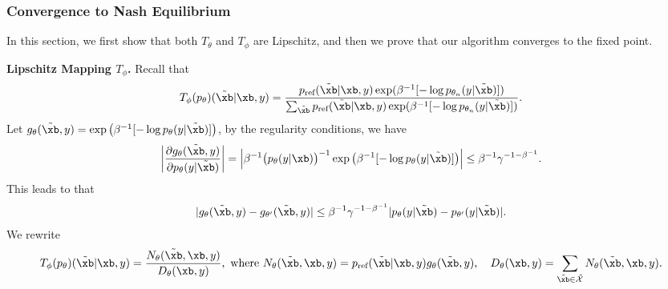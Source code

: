 \subsubsection{Convergence to Nash Equilibrium}
In this section, we first show that both $T_\theta$ and $T_\phi$ are Lipschitz, and then we prove that our algorithm converges to the fixed point. 

\textbf{Lipschitz Mapping $T_\phi$.} Recall that
\begin{align*}
    T_\phi(p_\theta)(\tilde{\xb}|\xb,y) = \frac{p_{\text{ref}}(\tilde{\xb}|\xb,y) \exp(\beta^{-1} [-\log p_{\theta_{n}}(y|\tilde{\xb})] )}{\sum_{\tilde{\xb}} p_{\text{ref}}(\tilde{\xb} |\xb,y) \exp(\beta^{-1} [-\log p_{\theta_{n}}(y|\tilde{\xb})] )}.
\end{align*}
Let $g_\theta(\tilde\xb,y) = \exp\big(\beta^{-1} [-\log p_{\theta}(y|\tilde{\xb})] \big)$, by the regularity conditions, we have
\begin{align*}
    \bigg|\frac{\partial g_\theta (\tilde\xb,y)}{\partial p_\theta(y | \tilde{\xb})}\bigg|  = \Big|\beta^{-1} \big( p_\theta(y|\xb)\big)^{-1}\exp\big(\beta^{-1} [-\log p_{\theta}( y|\tilde{\xb})] \big)\Big| 
    \le \beta^{-1} \gamma^{-1-\beta^{-1}}.
\end{align*}
This leads to that
\begin{align*}
    |g_\theta(\tilde\xb,y) - g_{\theta'}(\tilde\xb,y)| \le \beta^{-1} \gamma^{-1-\beta^{-1}} |p_\theta(y|\tilde\xb) - p_{\theta'}(y|\tilde\xb)|.
\end{align*}
We rewrite 
\begin{align*}
    T_\phi(p_\theta)(\tilde\xb|\xb,y) = \frac{N_\theta(\tilde\xb,\xb,y)}{D_\theta(\xb,y)},\text{ where }N_\theta(\tilde\xb,\xb,y)=p_{\text{ref}}(\tilde{\xb}|\xb,y)g_\theta(\tilde\xb,y),\quad D_\theta(\xb, y) = \sum_{\tilde\xb\in\tilde{\mathcal{X}}} N_\theta(\tilde\xb,\xb,y).
\end{align*}

